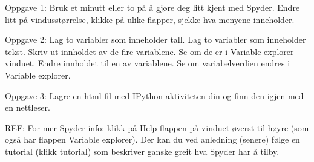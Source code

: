 Oppgave 1:
Bruk et minutt eller to på å gjøre deg litt kjent med Spyder.
Endre litt på vindusstørrelse, klikke på ulike flapper, sjekke hva menyene inneholder. 

Oppgave 2:
Lag to variabler som inneholder tall. Lag to variabler som inneholder tekst.
Skriv ut innholdet av de fire variablene. Se om de er i Variable explorer-vinduet.
Endre innholdet til en av variablene. Se om variabelverdien endres i Variable explorer.

Oppgave 3:
Lagre en html-fil med IPython-aktiviteten din og finn den igjen med en nettleser. 


REF: For mer Spyder-info: klikk på Help-flappen på vinduet øverst til høyre
(som også har flappen Variable explorer).
Der kan du ved anledning (senere) følge en tutorial (klikk tutorial)
som beskriver ganske greit hva Spyder har å tilby.


\fi